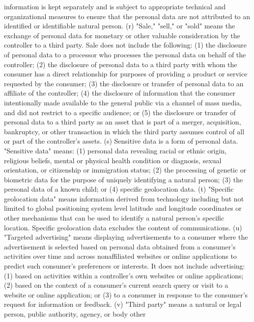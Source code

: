 information is kept separately and is subject to appropriate technical and organizational
measures to ensure that the personal data are not attributed to an identified or identifiable
natural person.
(r) "Sale," "sell," or "sold" means the exchange of personal data for monetary or other
valuable consideration by the controller to a third party. Sale does not include the following:
(1) the disclosure of personal data to a processor who processes the personal data on
behalf of the controller;
(2) the disclosure of personal data to a third party with whom the consumer has a direct
relationship for purposes of providing a product or service requested by the consumer;
(3) the disclosure or transfer of personal data to an affiliate of the controller;
(4) the disclosure of information that the consumer intentionally made available to the
general public via a channel of mass media, and did not restrict to a specific audience; or
(5) the disclosure or transfer of personal data to a third party as an asset that is part of a
merger, acquisition, bankruptcy, or other transaction in which the third party assumes control
of all or part of the controller's assets.
(s) Sensitive data is a form of personal data. "Sensitive data" means:
(1) personal data revealing racial or ethnic origin, religious beliefs, mental or physical
health condition or diagnosis, sexual orientation, or citizenship or immigration status;
(2) the processing of genetic or biometric data for the purpose of uniquely identifying
a natural person;
(3) the personal data of a known child; or
(4) specific geolocation data.
(t) "Specific geolocation data" means information derived from technology including
but not limited to global positioning system level latitude and longitude coordinates or other
mechanisms that can be used to identify a natural person's specific location. Specific
geolocation data excludes the content of communications.
(u) "Targeted advertising" means displaying advertisements to a consumer where the
advertisement is selected based on personal data obtained from a consumer's activities over
time and across nonaffiliated websites or online applications to predict such consumer's
preferences or interests. It does not include advertising:
(1) based on activities within a controller's own websites or online applications;
(2) based on the context of a consumer's current search query or visit to a website or
online application; or
(3) to a consumer in response to the consumer's request for information or feedback.
(v) "Third party" means a natural or legal person, public authority, agency, or body other
